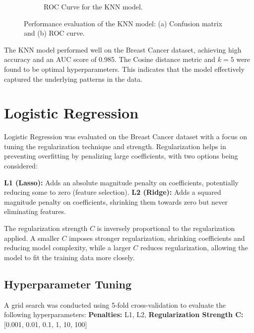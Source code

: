 \documentclass[12pt]{article}
\begin{document}
\begin{figure}[h!]
\begin{subfigure}[b]{0.4\textwidth}
        \caption{ROC Curve for the KNN model.}
        \label{fig:roc_curve_knn}
    \end{subfigure}
    \vspace{-10pt} %
    \caption{Performance evaluation of the KNN model: (a) Confusion matrix and (b) ROC curve.}
    \label{fig:knn_side_by_side}
\end{figure}


\vspace{-15pt} %
The KNN model performed well on the Breast Cancer dataset, achieving high accuracy and an AUC score of 0.985. The Cosine distance metric and $k=5$ were found to be optimal hyperparameters. This indicates that the model effectively captured the underlying patterns in the data.

\section{Logistic Regression}
Logistic Regression was evaluated on the Breast Cancer dataset with a focus on tuning the regularization technique and strength. Regularization helps in preventing overfitting by penalizing large coefficients, with two options being considered:

\vspace{-0.35cm}

\textbf{L1 (Lasso):} Adds an absolute magnitude penalty on coefficients, potentially reducing some to zero (feature selection).  \textbf{L2 (Ridge):} Adds a squared magnitude penalty on coefficients, shrinking them towards zero but never eliminating features. 

\vspace{-0.35cm}

The regularization strength $C$ is inversely proportional to the regularization applied. A smaller $C$ imposes stronger regularization, shrinking coefficients and reducing model complexity, while a larger  $C$ reduces regularization, allowing the model to fit the training data more closely.\cite{qin20191}

\subsection*{Hyperparameter Tuning}

A grid search was conducted using 5-fold cross-validation to evaluate the following hyperparameters: \textbf{Penalties:} L1, L2, \textbf{Regularization Strength  C:} [0.001, 0.01, 0.1, 1, 10, 100] 
\end{document}
